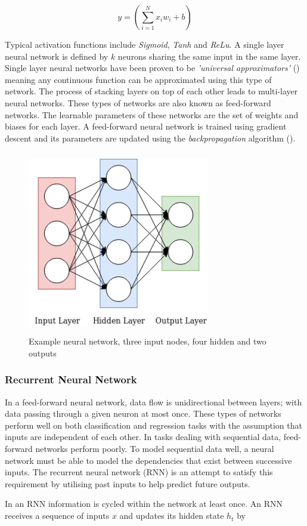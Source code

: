 \begin{equation}
	y = \left( \sum_{i=1}^{N} x_{i}w_{i} + b\right)
\end{equation}

\noindent
\newline
Typical activation functions include \textit{Sigmoid}, \textit{Tanh} and \textit{ReLu}. A single layer neural network is defined by \(k\) neurons sharing the same input in the same layer. Single layer neural networks have been proven to be \textit{'universal approximators'} (\cite{Hornik1989}) meaning any continuous function can be approximated using this type of network. The process of stacking layers on top of each other leads to multi-layer neural networks. These types of networks are also known as feed-forward networks. The learnable parameters of these networks are the set of weights and biases for each layer. A feed-forward neural network is trained using gradient descent and its parameters are updated using the \textit{backpropagation} algorithm (\cite{Rumelhart1988}).

\begin{figure}[h]
	\includegraphics[width=8cm, height=8cm]{./figures/fig2}
	\centering
	\caption{Example neural network, three input nodes, four hidden and two outputs}
	\label{fig:fig2}
\end{figure}

\subsubsection{Recurrent Neural Network}
In a feed-forward neural network, data flow is unidirectional between layers; with data passing through a given neuron at most once. These types of networks perform well on both classification and regression tasks with the assumption that inputs are independent of each other. In tasks dealing with sequential data, feed-forward networks perform poorly. To model sequential data well, a neural network must be able to model the dependencies that exist between successive inputs. The recurrent neural network (RNN) is an attempt to satisfy this requirement by utilising past inputs to help predict future outputs.
\par
\noindent
\newline
In an RNN information is cycled within the network at least once.  An RNN receives a sequence of inputs \(x\) and updates its hidden state \(h_{t}\) by 

